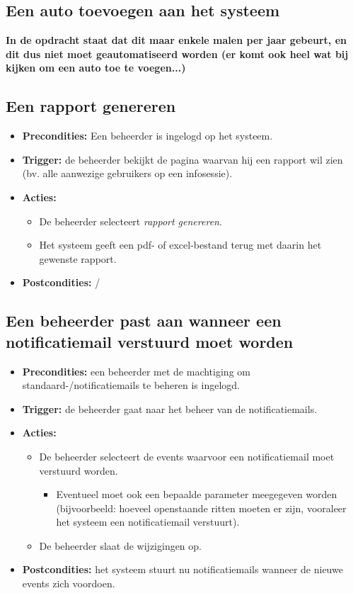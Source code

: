 \documentclass[]{article}
\begin{document}
\subsection{Een auto toevoegen aan het systeem}
\textbf{In de opdracht staat dat dit maar enkele malen per jaar gebeurt, en dit dus niet moet geautomatiseerd worden (er komt ook heel wat bij kijken om een auto toe te voegen...)}


\subsection{Een rapport genereren}
\begin{itemize}
\item \textbf{Precondities:} Een beheerder is ingelogd op het systeem.
\item \textbf{Trigger:} de beheerder bekijkt de pagina waarvan hij een rapport wil zien (bv. alle aanwezige gebruikers op een infosessie).

\item \textbf{Acties:} 
\begin{itemize}
	\item	De beheerder selecteert \emph{rapport genereren}.
	\item	Het systeem geeft een pdf- of excel-bestand terug met daarin het gewenste rapport.
\end{itemize}
\item \textbf{Postcondities:} /
\end{itemize}


\subsection{Een beheerder past aan wanneer een notificatiemail verstuurd moet worden}
\begin{itemize}
\item \textbf{Precondities:} een beheerder met de machtiging om standaard-/notificatiemails te beheren is ingelogd.
\item \textbf{Trigger:} de beheerder gaat naar het beheer van de notificatiemails.
\item \textbf{Acties:} 
\begin{itemize}
	\item	De beheerder selecteert de events waarvoor een notificatiemail moet verstuurd worden.
		\begin{itemize}
			\item Eventueel moet ook een bepaalde parameter meegegeven worden (bijvoorbeeld: hoeveel openstaande ritten moeten er zijn, vooraleer het systeem een notificatiemail verstuurt).
		\end{itemize}
	\item	De beheerder slaat de wijzigingen op.
\end{itemize}
\item \textbf{Postcondities:} het systeem stuurt nu notificatiemails wanneer de nieuwe events zich voordoen.
\end{itemize}
\end{document}
